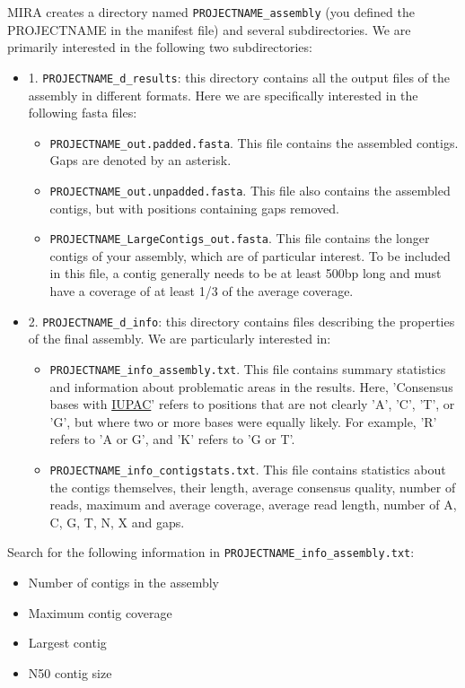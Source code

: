 \documentclass[11pt]{article}
\begin{document}
MIRA creates a directory named \texttt{PROJECTNAME\_assembly} (you defined the
PROJECTNAME in the manifest file) and several subdirectories. We are
primarily interested in the following two subdirectories:
\begin{itemize}
\item 1. \texttt{PROJECTNAME\_d\_results}: this directory contains all the output
files of the assembly in different formats. Here we are specifically
interested in the following fasta files:
\begin{itemize}
\item \texttt{PROJECTNAME\_out.padded.fasta}. This file contains the assembled contigs. Gaps are denoted by an asterisk.
\item \texttt{PROJECTNAME\_out.unpadded.fasta}. This file also contains
the assembled contigs, but with positions containing gaps removed.
\item \texttt{PROJECTNAME\_LargeContigs\_out.fasta}. This file contains the longer contigs of
your assembly, which are of particular interest. To be included in
this file, a contig generally needs to be at least 500bp long and
must have a coverage of at least 1/3 of the average coverage.
\end{itemize}
\item 2. \texttt{PROJECTNAME\_d\_info}: this directory contains files describing the properties of
the final assembly. We are particularly interested in:
\begin{itemize}
\item \texttt{PROJECTNAME\_info\_assembly.txt}. This file contains
summary statistics and information about problematic areas in the
results. Here, 'Consensus bases with \href{http://www.bioinformatics.org/sms/iupac.html}{IUPAC}' refers to positions
that are not clearly 'A', 'C', 'T', or 'G', but where two or more
bases were equally likely. For example, 'R' refers to 'A or G', and
'K' refers to 'G or T'.
\item \texttt{PROJECTNAME\_info\_contigstats.txt}. This file
contains statistics about the contigs themselves, their length,
average consensus quality, number of reads, maximum and average
coverage, average read length, number of A, C, G, T, N, X and gaps.
\end{itemize}
\end{itemize}


Search for the following information in \texttt{PROJECTNAME\_info\_assembly.txt}:
\begin{itemize}
\item Number of contigs in the assembly
\item Maximum contig coverage
\item Largest contig
\item N50 contig size
\end{itemize}
\end{document}
